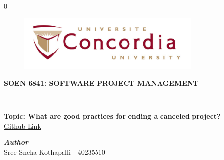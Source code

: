 \documentclass[11pt]{article}
\newcommand{\blind}{0}
\begin{document}
    \def\spacingset#1{\renewcommand{\baselinestretch}%
			{#1}\small\normalsize} \spacingset{1}
		
		\blind
		{
            \begin{titlepage}
            \vspace*{0.7in}
            \begin{center}
            \begin{figure}[htb]
            \begin{center}
            \includegraphics[width=9cm]{concordia-logo (1).jpg}
            \end{center}
            \end{figure}
            \vspace*{0.3in}
            \begin{Large}
            \textbf{SOEN 6841: SOFTWARE PROJECT MANAGEMENT} \\
            \end{Large}
            \vspace*{0.2in}
            \begin{Large}
            \end{Large}
            \\
            \vspace*{0.9in}
            \begin{Large}
            \textbf{Topic: What are good practices for ending
a canceled project?} \\
            \vspace*{0.2in}
            \href{https://github.com/SnehaKothapalli/SOEN-6841}{Github Link}\\
            \end{Large}
            \vspace*{0.75in}
            \begin{Large}
            \textbf{\emph{Author}} \\
            \vspace*{0.1in}
            Sree Sneha Kothapalli - 40235510\\
            \vspace*{0.2in}

\end{Large}
\end{center}
\end{titlepage}}
\end{document}
